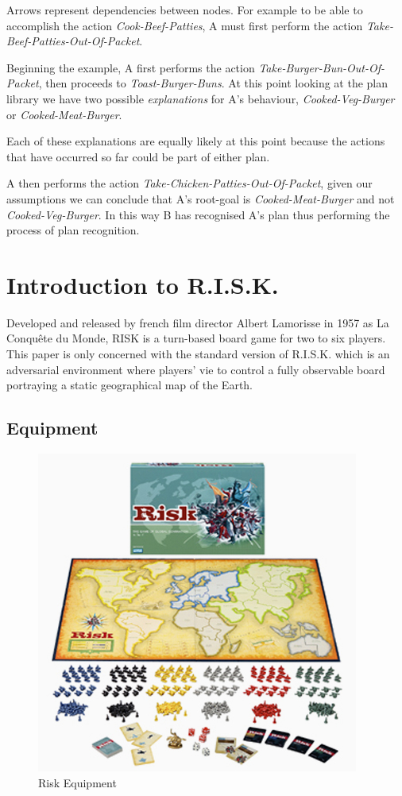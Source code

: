 \documentclass[parskip]{cs4rep}
\begin{document}
Arrows represent dependencies between nodes. For example to be able to accomplish the action \textit{Cook-Beef-Patties}, A must first perform the action \textit{Take-Beef-Patties-Out-Of-Packet}.

Beginning the example, A first performs the action \textit{Take-Burger-Bun-Out-Of-Packet}, then proceeds to \textit{Toast-Burger-Buns}. At this point looking at the plan library we have two possible \textit{explanations} for A's behaviour, \textit{Cooked-Veg-Burger} or \textit{Cooked-Meat-Burger}.

Each of these explanations are equally likely at this point because the actions that have occurred so far could be part of either plan.

A then performs the action \textit{Take-Chicken-Patties-Out-Of-Packet}, given our assumptions we can conclude that A's root-goal is \textit{Cooked-Meat-Burger} and not \textit{Cooked-Veg-Burger}. In this way B has recognised A's plan thus performing the process of plan recognition.

\newpage

\section{Introduction to R.I.S.K.}

Developed and released by french film director Albert Lamorisse in 1957 as La Conqu\^ete du Monde, RISK is a turn-based board game for two to six players. This paper is only concerned with the standard version of R.I.S.K. which is an adversarial environment where players' vie to control a fully observable board portraying a static geographical map of the Earth.

\subsection{Equipment}

\begin{figure}[h]
\centering
\includegraphics{images/risk-board}
\caption{Risk Equipment \cite{riskimage}}
\label{fig:risk-equipment}
\end{figure}
\end{document}
